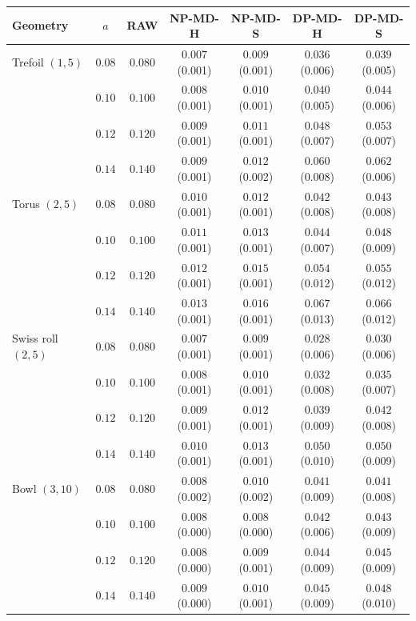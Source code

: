 \begin{tabular}{lcccccc}
\toprule
Geometry & $a$ & RAW & NP-MD-H & NP-MD-S & DP-MD-H & DP-MD-S \\
\midrule
Trefoil $(1,5)$ & $0.08$ & $0.080$ & $0.007$ \scriptsize(0.001) & $0.009$ \scriptsize(0.001) & $0.036$ \scriptsize(0.006) & $0.039$ \scriptsize(0.005) \\
 & $0.10$ & $0.100$ & $0.008$ \scriptsize(0.001) & $0.010$ \scriptsize(0.001) & $0.040$ \scriptsize(0.005) & $0.044$ \scriptsize(0.006) \\
 & $0.12$ & $0.120$ & $0.009$ \scriptsize(0.001) & $0.011$ \scriptsize(0.001) & $0.048$ \scriptsize(0.007) & $0.053$ \scriptsize(0.007) \\
 & $0.14$ & $0.140$ & $0.009$ \scriptsize(0.001) & $0.012$ \scriptsize(0.002) & $0.060$ \scriptsize(0.008) & $0.062$ \scriptsize(0.006) \\
\midrule
Torus $(2,5)$ & $0.08$ & $0.080$ & $0.010$ \scriptsize(0.001) & $0.012$ \scriptsize(0.001) & $0.042$ \scriptsize(0.008) & $0.043$ \scriptsize(0.008) \\
 & $0.10$ & $0.100$ & $0.011$ \scriptsize(0.001) & $0.013$ \scriptsize(0.001) & $0.044$ \scriptsize(0.007) & $0.048$ \scriptsize(0.009) \\
 & $0.12$ & $0.120$ & $0.012$ \scriptsize(0.001) & $0.015$ \scriptsize(0.001) & $0.054$ \scriptsize(0.012) & $0.055$ \scriptsize(0.012) \\
 & $0.14$ & $0.140$ & $0.013$ \scriptsize(0.001) & $0.016$ \scriptsize(0.001) & $0.067$ \scriptsize(0.013) & $0.066$ \scriptsize(0.012) \\
\midrule
Swiss roll $(2,5)$ & $0.08$ & $0.080$ & $0.007$ \scriptsize(0.001) & $0.009$ \scriptsize(0.001) & $0.028$ \scriptsize(0.006) & $0.030$ \scriptsize(0.006) \\
 & $0.10$ & $0.100$ & $0.008$ \scriptsize(0.001) & $0.010$ \scriptsize(0.001) & $0.032$ \scriptsize(0.008) & $0.035$ \scriptsize(0.007) \\
 & $0.12$ & $0.120$ & $0.009$ \scriptsize(0.001) & $0.012$ \scriptsize(0.001) & $0.039$ \scriptsize(0.009) & $0.042$ \scriptsize(0.008) \\
 & $0.14$ & $0.140$ & $0.010$ \scriptsize(0.001) & $0.013$ \scriptsize(0.001) & $0.050$ \scriptsize(0.010) & $0.050$ \scriptsize(0.009) \\
\midrule
Bowl $(3,10)$ & $0.08$ & $0.080$ & $0.008$ \scriptsize(0.002) & $0.010$ \scriptsize(0.002) & $0.041$ \scriptsize(0.009) & $0.041$ \scriptsize(0.008) \\
 & $0.10$ & $0.100$ & $0.008$ \scriptsize(0.000) & $0.008$ \scriptsize(0.000) & $0.042$ \scriptsize(0.006) & $0.043$ \scriptsize(0.009) \\
 & $0.12$ & $0.120$ & $0.008$ \scriptsize(0.000) & $0.009$ \scriptsize(0.001) & $0.044$ \scriptsize(0.009) & $0.045$ \scriptsize(0.009) \\
 & $0.14$ & $0.140$ & $0.009$ \scriptsize(0.000) & $0.010$ \scriptsize(0.001) & $0.045$ \scriptsize(0.009) & $0.048$ \scriptsize(0.010) \\
\bottomrule
\end{tabular}
